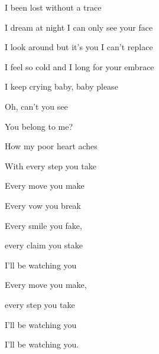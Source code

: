 I been lost without a trace

I dream at night I can only see your face

I look around but it's you I can't replace

I feel so cold and I long for your embrace

I keep crying baby, baby please
\ks

\zr
Oh, can't you see

You belong to me?

How my poor heart aches 

With every step you take
\kr

\zs
Every move you make

Every vow you break

Every smile you fake, 

every claim you stake

I'll be watching you
\ks

\zs
Every move you make, 

every step you take

I'll be watching you

I'll be watching you.
\ks

\kp
